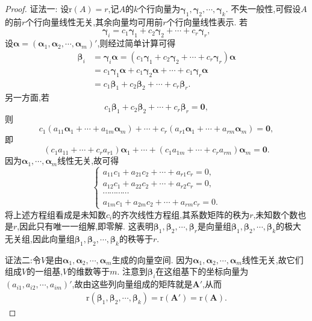 \documentclass[../../main.tex]{subfiles}%
\begin{document}
\begin{proof}

{\color{blue}证法一:}
设\(\text{r}(A)=r\),记\(A\)的\(k\)个行向量为\(\boldsymbol{\gamma}_1,\boldsymbol{\gamma}_2,\cdots,\boldsymbol{\gamma}_k\). 不失一般性,可假设\(A\)的前\(r\)个行向量线性无关,其余向量均可用前\(r\)个行向量线性表示. 若
\[
\boldsymbol{\gamma}_i = c_1\boldsymbol{\gamma}_1 + c_2\boldsymbol{\gamma}_2+\cdots + c_r\boldsymbol{\gamma}_r,
\]
设$\boldsymbol{\alpha }=\left( \boldsymbol{\alpha }_1,\boldsymbol{\alpha }_2,\cdots ,\boldsymbol{\alpha }_m \right)'$,则经过简单计算可得
\begin{align*}
\boldsymbol{\beta }_i&=\boldsymbol{\gamma }_i\boldsymbol{\alpha }=\left( c_1\boldsymbol{\gamma }_1+c_2\boldsymbol{\gamma }_2+\cdots +c_r\boldsymbol{\gamma }_r \right) \boldsymbol{\alpha }
\\
&=c_1\boldsymbol{\gamma }_1\boldsymbol{\alpha }+c_1\boldsymbol{\gamma }_2\boldsymbol{\alpha }+\cdots +c_1\boldsymbol{\gamma }_r\boldsymbol{\alpha }
\\
&=c_1\boldsymbol{\beta }_1+c_2\boldsymbol{\beta }_2+\cdots +c_r\boldsymbol{\beta }_r. 
\end{align*}
另一方面,若
\[
c_1\boldsymbol{\beta}_1 + c_2\boldsymbol{\beta}_2+\cdots + c_r\boldsymbol{\beta}_r=\boldsymbol{0},
\]
则
\[
c_1(a_{11}\boldsymbol{\alpha}_1+\cdots + a_{1m}\boldsymbol{\alpha}_m)+\cdots + c_r(a_{r1}\boldsymbol{\alpha}_1+\cdots + a_{rm}\boldsymbol{\alpha}_m)=\boldsymbol{0},
\]
即
\[
(c_1a_{11}+\cdots + c_ra_{r1})\boldsymbol{\alpha}_1+\cdots + (c_1a_{1m}+\cdots + c_ra_{rm})\boldsymbol{\alpha}_m=\boldsymbol{0}.
\]
因为\(\boldsymbol{\alpha}_1,\cdots,\boldsymbol{\alpha}_m\)线性无关,故可得
\[
\begin{cases}
a_{11}c_1 + a_{21}c_2+\cdots + a_{r1}c_r = 0,\\
a_{12}c_1 + a_{22}c_2+\cdots + a_{r2}c_r = 0,\\
\cdots\cdots\cdots\cdots\\
a_{1m}c_1 + a_{2m}c_2+\cdots + a_{rm}c_r = 0.
\end{cases}
\]
将上述方程组看成是未知数\(c_i\)的齐次线性方程组,其系数矩阵的秩为\(r\),未知数个数也是\(r\),因此只有唯一一组解,即零解. 这表明\(\boldsymbol{\beta}_1,\boldsymbol{\beta}_2,\cdots,\boldsymbol{\beta}_r\)是向量组\(\boldsymbol{\beta}_1,\boldsymbol{\beta}_2,\cdots,\boldsymbol{\beta}_k\)的极大无关组,因此向量组\(\boldsymbol{\beta}_1,\boldsymbol{\beta}_2,\cdots,\boldsymbol{\beta}_k\)的秩等于\(r\).

{\color{blue}证法二:}令\(V\)是由\(\boldsymbol{\alpha}_1,\boldsymbol{\alpha}_2,\cdots,\boldsymbol{\alpha}_m\)生成的向量空间. 因为\(\boldsymbol{\alpha}_1,\boldsymbol{\alpha}_2,\cdots,\boldsymbol{\alpha}_m\)线性无关,故它们组成\(V\)的一组基,\(V\)的维数等于\(m\). 注意到\(\boldsymbol{\beta}_i\)在这组基下的坐标向量为\((a_{i1},a_{i2},\cdots,a_{im})'\),故由这些列向量组成的矩阵就是\(\boldsymbol{A}'\),从而
\begin{align*}
\mathrm{r}\left( \boldsymbol{\beta }_1,\boldsymbol{\beta }_2,\cdots ,\boldsymbol{\beta }_k \right) =\mathrm{r}\left( \boldsymbol{A}' \right) =\mathrm{r}\left( \boldsymbol{A} \right) .
\end{align*}
\end{proof}
\end{document}
